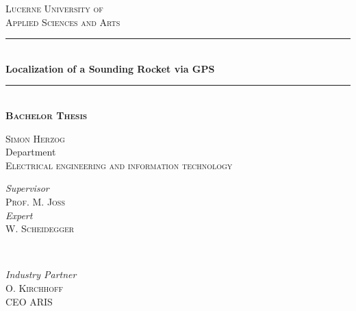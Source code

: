 
\begin{titlepage} %
	\newcommand{\HRule}{\rule{\linewidth}{0.5mm}} %
	
	\center %
	
	\textsc{\large Lucerne University of\\ Applied Sciences and Arts}\\[0.2cm] %
	
	
	\HRule\\[0.4cm]
	
	{\LARGE\bfseries Localization of a Sounding Rocket via GPS}\\[0.4cm] %
	
	\HRule\\[0.5cm]
	
	\large \textsc{\textbf{Bachelor Thesis}}\\[0.5cm] 
	
	\vfill
	
	\textsc{\normalsize Simon Herzog}\\[0.3cm]
	
	{\normalsize Department}\\
	
	\textsc{\normalsize Electrical engineering and information technology}\\[0.3cm] %
	
	\vfill
	
	
	\begin{minipage}{0.4\textwidth}
		\begin{flushleft}
			\normalsize
			\textit{Supervisor}\\
			\textsc{Prof.} M. \textsc{Joss} %
			\vspace{4mm}\\
			\normalsize
			\textit{Expert}\\
			W. \textsc{Scheidegger} %
		\end{flushleft}
	\end{minipage}
	~
	\begin{minipage}{0.4\textwidth}
		\begin{flushright}
			\normalsize
			\textit{Industry Partner}\\
			O. \textsc{Kirchhoff}\\
			CEO ARIS
		\end{flushright}
	\end{minipage}
	

\end{titlepage}
